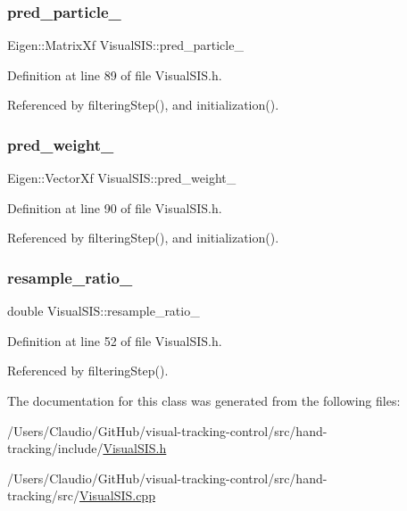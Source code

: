 \subsubsection{\texorpdfstring{pred\+\_\+particle\+\_\+}{pred\_particle\_}}
{\footnotesize\ttfamily Eigen\+::\+Matrix\+Xf Visual\+S\+I\+S\+::pred\+\_\+particle\+\_\+\hspace{0.3cm}{\ttfamily [private]}}



Definition at line 89 of file Visual\+S\+I\+S.\+h.



Referenced by filtering\+Step(), and initialization().

\mbox{\label{classVisualSIS_aa0251c7dd7c4d13a849b051145dbcc78}} 
\subsubsection{\texorpdfstring{pred\+\_\+weight\+\_\+}{pred\_weight\_}}
{\footnotesize\ttfamily Eigen\+::\+Vector\+Xf Visual\+S\+I\+S\+::pred\+\_\+weight\+\_\+\hspace{0.3cm}{\ttfamily [private]}}



Definition at line 90 of file Visual\+S\+I\+S.\+h.



Referenced by filtering\+Step(), and initialization().

\mbox{\label{classVisualSIS_a5e400fe8722793a0cc3a64900b30ff6a}} 
\subsubsection{\texorpdfstring{resample\+\_\+ratio\+\_\+}{resample\_ratio\_}}
{\footnotesize\ttfamily double Visual\+S\+I\+S\+::resample\+\_\+ratio\+\_\+\hspace{0.3cm}{\ttfamily [protected]}}



Definition at line 52 of file Visual\+S\+I\+S.\+h.



Referenced by filtering\+Step().



The documentation for this class was generated from the following files\+:\begin{DoxyCompactItemize}
\item 
/\+Users/\+Claudio/\+Git\+Hub/visual-\/tracking-\/control/src/hand-\/tracking/include/\hyperlink{VisualSIS_8h}{Visual\+S\+I\+S.\+h}\item 
/\+Users/\+Claudio/\+Git\+Hub/visual-\/tracking-\/control/src/hand-\/tracking/src/\hyperlink{VisualSIS_8cpp}{Visual\+S\+I\+S.\+cpp}\end{DoxyCompactItemize}
